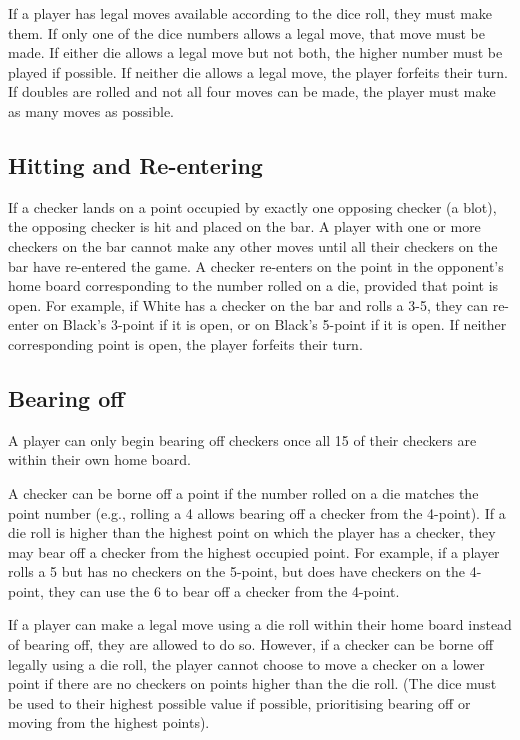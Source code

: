 If a player has legal moves available according to the dice roll, they must make them. 
If only one of the dice numbers allows a legal move, that move must be made. 
If either die allows a legal move but not both, the higher number must be played if possible. 
If neither die allows a legal move, the player forfeits their turn. 
If doubles are rolled and not all four moves can be made, the player must make as many moves as possible.

\subsection{Hitting and Re-entering}
If a checker lands on a point occupied by exactly one opposing checker (a blot), the opposing checker is hit and placed on the bar.
A player with one or more checkers on the bar cannot make any other moves until all their checkers on the bar have re-entered the game. 
A checker re-enters on the point in the opponent's home board corresponding to the number rolled on a die, provided that point is open. 
For example, if White has a checker on the bar and rolls a 3-5, they can re-enter on Black's 3-point if it is open, or on Black's 5-point if it is open. 
If neither corresponding point is open, the player forfeits their turn.

\subsection{Bearing off}
A player can only begin bearing off checkers once all 15 of their checkers are within their own home board.

A checker can be borne off a point if the number rolled on a die matches the point number (e.g., rolling a 4 allows bearing off a checker from the 4-point).
If a die roll is higher than the highest point on which the player has a checker, they may bear off a checker from the highest occupied point. 
For example, if a player rolls a 5 but has no checkers on the 5-point, but does have checkers on the 4-point, they can use the 6 to bear off a checker from the 4-point.

If a player can make a legal move using a die roll within their home board instead of bearing off, they are allowed to do so. However, if a checker can be borne off legally using a die roll, the player cannot choose to move a checker on a lower point if there are no checkers on points higher than the die roll. (The dice must be used to their highest possible value if possible, prioritising bearing off or moving from the highest points).

